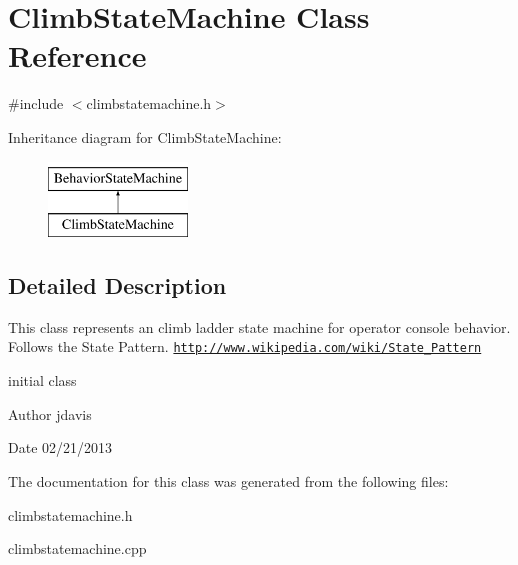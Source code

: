 \hypertarget{classClimbStateMachine}{\section{Climb\-State\-Machine Class Reference}
\label{classClimbStateMachine}
}


{\ttfamily \#include $<$climbstatemachine.\-h$>$}

Inheritance diagram for Climb\-State\-Machine\-:\begin{figure}[H]
\begin{center}
\leavevmode
\includegraphics[height=2.000000cm]{classClimbStateMachine}
\end{center}
\end{figure}


\subsection{Detailed Description}
This class represents an climb ladder state machine for operator console behavior. Follows the State Pattern. \href{http://www.wikipedia.com/wiki/State_Pattern}{\tt http\-://www.\-wikipedia.\-com/wiki/\-State\-\_\-\-Pattern}

initial class \begin{DoxyAuthor}{Author}
jdavis 
\end{DoxyAuthor}
\begin{DoxyDate}{Date}
02/21/2013 
\end{DoxyDate}


The documentation for this class was generated from the following files\-:\begin{DoxyCompactItemize}
\item 
climbstatemachine.\-h\item 
climbstatemachine.\-cpp\end{DoxyCompactItemize}
